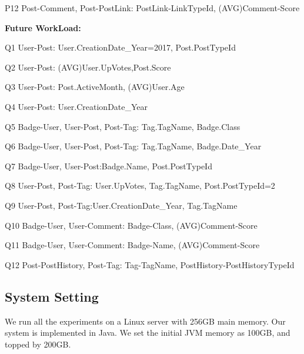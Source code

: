 P12 \hspace{1.3mm} Post-Comment, Post-PostLink: PostLink-LinkTypeId, (AVG)Comment-Score


\par
\textbf{Future WorkLoad:}

Q1 \hspace{3mm} User-Post: User.CreationDate\_Year=2017, Post.PostTypeId

Q2 \hspace{3mm} User-Post: (AVG)User.UpVotes,Post.Score

Q3 \hspace{3mm} User-Post: Post.ActiveMonth, (AVG)User.Age

Q4 \hspace{3mm} User-Post: User.CreationDate\_Year

Q5 \hspace{3mm} Badge-User, User-Post, Post-Tag: Tag.TagName, Badge.Class

Q6 \hspace{3mm} Badge-User, User-Post, Post-Tag: Tag.TagName, Badge.Date\_Year

Q7 \hspace{3mm} Badge-User, User-Post:Badge.Name, Post.PostTypeId

Q8 \hspace{3mm} User-Post, Post-Tag: User.UpVotes, Tag.TagName, Post.PostTypeId=2

Q9 \hspace{3mm} User-Post, Post-Tag:User.CreationDate\_Year, Tag.TagName

Q10 \hspace{1.3mm} Badge-User, User-Comment: Badge-Class, (AVG)Comment-Score

Q11 \hspace{1.3mm} Badge-User, User-Comment: Badge-Name, (AVG)Comment-Score

Q12 \hspace{1.3mm} Post-PostHistory, Post-Tag: Tag-TagName, PostHistory-PostHistoryTypeId





\subsection{System Setting}

We run all the experiments on a Linux server with 256GB main memory. Our system is implemented in Java. We set the initial JVM memory as 100GB, and topped by 200GB.

